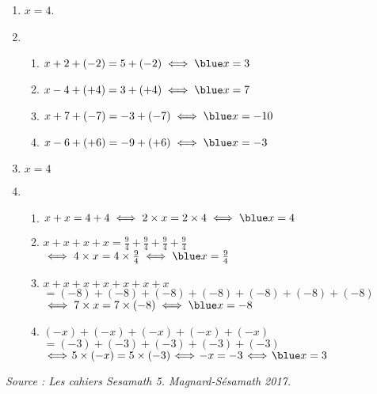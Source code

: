 \begin{colonne*exercice}
\begin{corrige}
\bigskip
{}
\medskip

\begin{enumerate}
   \item {\blue $x =4$}.
   \item
   \begin{enumerate}
      \item $x+2+(-2) =5+(-2) \iff {\blue x =3}$
      \item $x-4+(+4) =3+(+4) \iff {\blue x =7}$
      \item $x+7+(-7) =-3+(-7) \iff {\blue x =-10}$
      \item $x-6+(+6) =-9+(+6) \iff {\blue x =-3}$
   \end{enumerate}
   \setcounter{enumi}{2}
   \item {\blue $x =4$}
   \item
   \begin{enumerate}
      \item $x+x =4+4 \iff 2\times x =2\times4 \iff {\blue x =4}$
      \item $x+x+x+x =\frac94+\frac94+\frac94+\frac94$ \\
         $\iff 4\times x =4\times\frac94 \iff {\blue x =\frac94}$
      \item $x+x+x+x+x+x+x$ \\
         $=(-8)+(-8)+(-8)+(-8)+(-8)+(-8)+(-8)$ \\
         $\iff 7\times x =7\times(-8) \iff {\blue x =-8}$
      \item $(-x)+(-x)+(-x)+(-x)+(-x)$ \\
         $=(-3)+(-3)+(-3)+(-3)+(-3)$ \\
         $\iff \! 5\times(-x) =5\times(-3) \! \iff \! -x =-3 \! \iff \! {\blue x =3}$
   \end{enumerate}
\end{enumerate}

\end{corrige}

\vfill\hfill {\it\footnotesize Source : Les cahiers Sesamath 5. Magnard-Sésamath 2017.}

\end{colonne*exercice}


\Recreation

\newcommand{\balance}{
   \psset{linewidth=1mm,linecolor=gray!75}
   \psarc(-3,1.75){0.25}{180}{270}
   \psline(-3,1.5)(-1,1.5)
   \psarc(-1,1.75){0.25}{-90}{0}
   \psarc(3,1.75){0.25}{-90}{0}
   \psline(3,1.5)(1,1.5)
   \psarc(1,1.75){0.25}{180}{270}
   \psset{linecolor=brown}
   \psline(-1,0)(1,0)
   \psline(0,0)(0,1)
   \psline(-2,1.45)(-2,1)(2,1)(2,1.45)
   \pspolygon[fillstyle=solid,fillcolor=brown](-0.5,0)(0.5,0)(0,0.5)
   \psset{linewidth=0.4mm,linecolor=black}}

